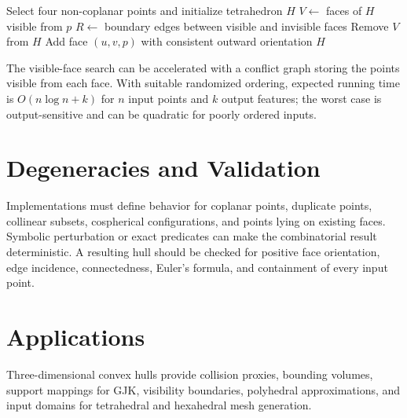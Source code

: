 \begin{algorithm}[htbp]
\caption{Incremental Three-Dimensional Convex Hull}
\label{alg:incremental_3d_hull}
\begin{algorithmic}[1]
  \State Select four non-coplanar points and initialize tetrahedron $H$
    \State $V\gets$ faces of $H$ visible from $p$
      \State $R\gets$ boundary edges between visible and invisible faces
      \State Remove $V$ from $H$
        \State Add face $(u,v,p)$ with consistent outward orientation
      \EndFor
    \EndIf
  \EndFor
  \State \Return $H$
\EndFunction
\end{algorithmic}
\end{algorithm}

The visible-face search can be accelerated with a conflict graph storing the
points visible from each face. With suitable randomized ordering, expected
running time is $O(n\log n+k)$ for $n$ input points and $k$ output features;
the worst case is output-sensitive and can be quadratic for poorly ordered
inputs.

\section{Degeneracies and Validation}
\label{sec:polyhedral_degeneracies}

Implementations must define behavior for coplanar points, duplicate points,
collinear subsets, cospherical configurations, and points lying on existing
faces. Symbolic perturbation or exact predicates can make the combinatorial
result deterministic. A resulting hull should be checked for positive face
orientation, edge incidence, connectedness, Euler's formula, and containment
of every input point.

\section{Applications}

Three-dimensional convex hulls provide collision proxies, bounding volumes,
support mappings for GJK, visibility boundaries, polyhedral approximations,
and input domains for tetrahedral and hexahedral mesh generation.

